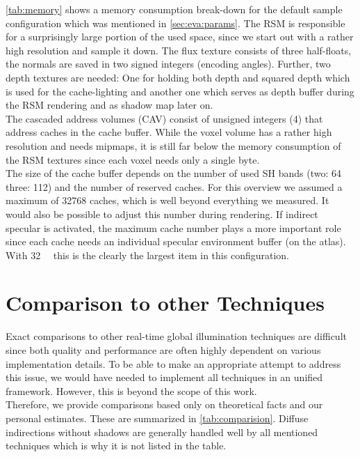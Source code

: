 \documentclass[thesis.tex]{subfiles}
\begin{document}
\autoref{tab:memory} shows a memory consumption break-down for the default sample configuration which was mentioned in \autoref{sec:eva:params}.
The RSM is responsible for a surprisingly large portion of the used space, since we start out with a rather high resolution and sample it down.
The flux texture consists of three half-floats, the normals are saved in two signed integers (encoding angles).
Further, two depth textures are needed:
One for holding both depth and squared depth which is used for the cache-lighting and another one which serves as depth buffer during the RSM rendering and as shadow map later on.
\\
The cascaded address volumes (CAV) consist of unsigned integers (\SI{4}{\byte}) that address caches in the cache buffer.
While the voxel volume has a rather high resolution and needs mipmaps, it is still far below the memory consumption of the RSM textures since each voxel needs only a single byte.
\\
The size of the cache buffer depends on the number of used SH bands (two: \SI{64}{\byte} three: \SI{112}{\byte}) and the number of reserved caches.
For this overview we assumed a maximum of 32768 caches, which is well beyond everything we measured.
It would also be possible to adjust this number during rendering.
If indirect specular is activated, the maximum cache number plays a more important role since each cache needs an individual specular environment buffer (on the atlas).
With \SI{32}{\mebi\byte} this is the clearly the largest item in this configuration.

\section{Comparison to other Techniques} \label{sec:eva:comparisiontoother}
Exact comparisons to other real-time global illumination techniques are difficult since both quality and performance are often highly dependent on various implementation details.
To be able to make an appropriate attempt to address this issue, we would have needed to implement all techniques in an unified framework.
However, this is beyond the scope of this work.
\\
Therefore, we provide comparisons based only on theoretical facts and our personal estimates.
These are summarized in \autoref{tab:comparision}.
Diffuse indirections without shadows are generally handled well by all mentioned techniques which is why it is not listed in the table.
\end{document}
